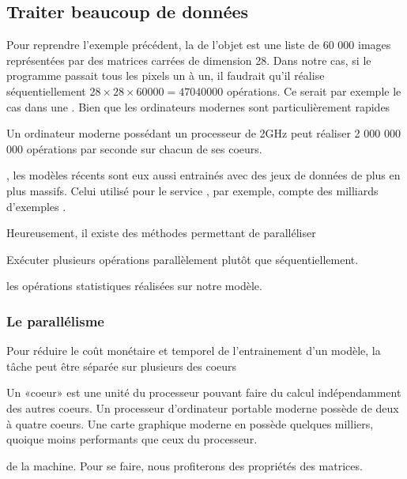 \documentclass[letterpaper,10pt,french]{sphinxmanual}
\begin{document}
\subsection{Traiter beaucoup de données}
\label{\detokenize{preprocessing:traiter-beaucoup-de-donnees}}
Pour reprendre l’exemple précédent, la  de l’objet est une liste de 60 000 images représentées par des matrices carrées de dimension 28. Dans notre cas, si le programme passait tous les pixels un à un, il faudrait qu’il réalise séquentiellement \(28 \times 28 \times 60 000 = 47 040 000\) opérations. Ce serait par exemple le cas dans une . Bien que les ordinateurs modernes sont particulièrement rapides%
\begin{footnote}[16]\sphinxAtStartFootnote
Un ordinateur moderne possédant un processeur de 2GHz peut réaliser 2 000 000 000 opérations par seconde sur chacun de ses coeurs.
%
\end{footnote}, les modèles récents sont eux aussi entrainés avec des jeux de données de plus en plus massifs. Celui utilisé pour le service , par exemple, compte des milliards d’exemples .

Heureusement, il existe des méthodes permettant de paralléliser%
\begin{footnote}[17]\sphinxAtStartFootnote
Exécuter plusieurs opérations parallèlement plutôt que séquentiellement.
%
\end{footnote} les opérations statistiques réalisées sur notre modèle.


\subsubsection{Le parallélisme}
\label{\detokenize{preprocessing:le-parallelisme}}
Pour réduire le coût monétaire et temporel de l’entrainement d’un modèle, la tâche peut être séparée sur plusieurs des coeurs%
\begin{footnote}[18]\sphinxAtStartFootnote
Un «coeur» est une unité du processeur pouvant faire du calcul indépendamment des autres coeurs. Un processeur d’ordinateur portable moderne possède de deux à quatre coeurs. Une carte graphique moderne en possède quelques milliers, quoique moins performants que ceux du processeur.
%
\end{footnote} de la machine. Pour se faire, nous profiterons des propriétés des matrices.
\end{document}

